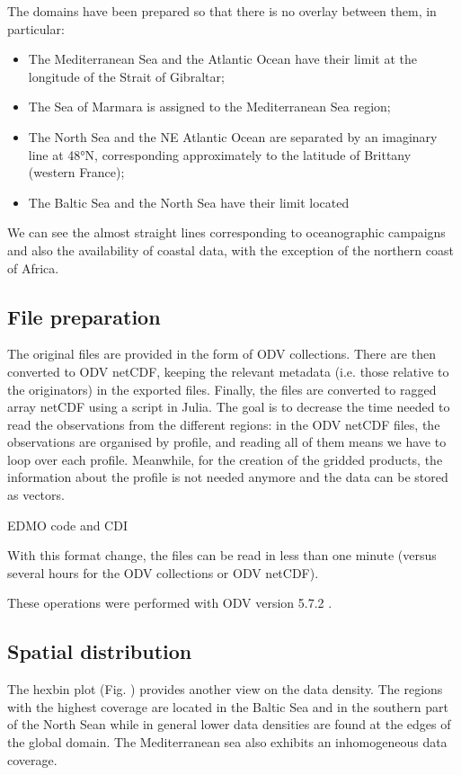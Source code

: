 \documentclass[essd, manuscript]{copernicus}
\begin{document}
The domains have been prepared so that there is no overlay between them, in particular: 
\begin{itemize}
\item The Mediterranean Sea and the Atlantic Ocean have their limit at the longitude of the Strait of Gibraltar;
\item The Sea of Marmara is assigned to the Mediterranean Sea region;
\item The North Sea and the NE Atlantic Ocean are separated by an imaginary line at 48°N, corresponding approximately to the latitude of Brittany (western France);
\item The Baltic Sea and the North Sea have their limit located 
\end{itemize}
We can see the almost straight lines corresponding to oceanographic campaigns and also the availability of coastal data, with the exception of the northern coast of Africa. 

\subsection{File preparation}

The original files are provided in the form of ODV \citep[Ocean Data View,][]{SCHLITZER2002} collections. There are then converted to ODV netCDF, keeping the relevant metadata (i.e. those relative to the originators) in the exported files. Finally, the files are converted to ragged array netCDF using a script in Julia. The goal is to decrease the time needed to read the observations from the different regions: in the ODV netCDF files, the observations are organised by profile, and reading all of them means we have to loop over each profile. Meanwhile, for the creation of the gridded products, the information about the profile is not needed anymore and the data can be stored as vectors.

EDMO code and CDI \citep{Schaap2010}

With this format change, the files can be read in less than one minute (versus several hours for the ODV collections or ODV netCDF).

These operations were performed with ODV version 5.7.2 \citep{Schlitzer2024}.
 

\subsection{Spatial distribution}

The hexbin plot (Fig. ) provides another view on the data density. The regions with the highest coverage are located in the Baltic Sea and in the southern part of the North Sean while in general lower data densities are found at the edges of the global domain. The Mediterranean sea also exhibits an inhomogeneous data coverage. 
\end{document}
